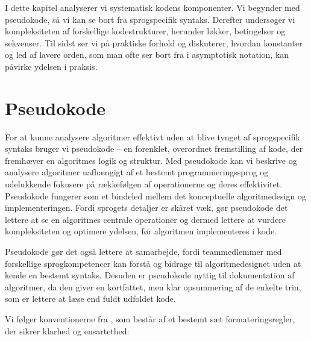 I dette kapitel analyserer vi systematisk kodens komponenter. Vi begynder med pseudokode, så vi kan se bort fra sprogspecifik syntaks. Derefter undersøger vi kompleksiteten af forskellige kodestrukturer, herunder løkker, betingelser og sekvenser. Til sidst ser vi på praktiske forhold og diskuterer, hvordan konstanter og led af lavere orden, som man ofte ser bort fra i asymptotisk notation, kan påvirke ydelsen i praksis.


\section{Pseudokode}\label{sec:ch11-1}
For at kunne analysere algoritmer effektivt uden at blive tynget af sprogspecifik syntaks bruger vi pseudokode -- en forenklet, overordnet fremstilling af kode, der fremhæver en algoritmes logik og struktur. Med pseudokode kan vi beskrive og analysere algoritmer uafhængigt af et bestemt programmeringssprog og udelukkende fokusere på rækkefølgen af operationerne og deres effektivitet. Pseudokode fungerer som et bindeled mellem det konceptuelle algoritmedesign og implementeringen. Fordi sprogets detaljer er skåret væk, gør pseudokode det lettere at se en algoritmes centrale operationer og dermed lettere at vurdere kompleksiteten og optimere ydelsen, før algoritmen implementeres i kode.

Pseudokode gør det også lettere at samarbejde, fordi teammedlemmer med forskellige sprogkompetencer kan forstå og bidrage til algoritmedesignet uden at kende en bestemt syntaks. Desuden er pseudokode nyttig til dokumentation af algoritmer, da den giver en kortfattet, men klar opsummering af de enkelte trin, som er lettere at læse end fuldt udfoldet kode.

Vi følger konventionerne fra \cite{clrs4}, som består af et bestemt sæt formateringsregler, der sikrer klarhed og ensartethed:

